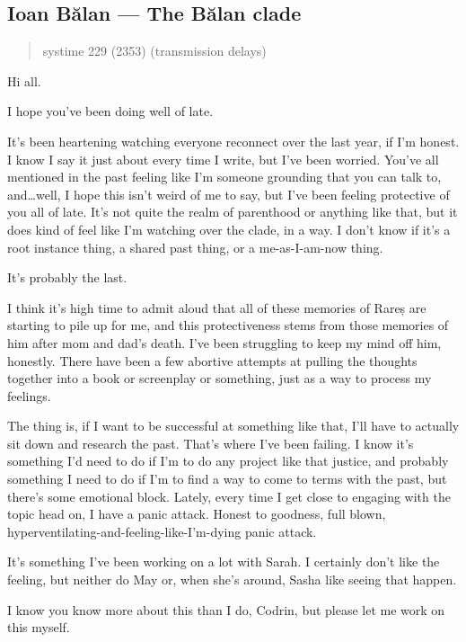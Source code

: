 \hypertarget{ioan-bux103lan-the-bux103lan-clade}{%
\subsection{Ioan Bălan — The Bălan clade}\label{ioan-bux103lan-the-bux103lan-clade}}

\begin{quote}
systime 229 (2353) (transmission delays)
\end{quote}

Hi all.

I hope you've been doing well of late.

It's been heartening watching everyone reconnect over the last year, if I'm honest. I know I say it just about every time I write, but I've been worried. You've all mentioned in the past feeling like I'm someone grounding that you can talk to, and\ldots well, I hope this isn't weird of me to say, but I've been feeling protective of you all of late. It's not quite the realm of parenthood or anything like that, but it does kind of feel like I'm watching over the clade, in a way. I don't know if it's a root instance thing, a shared past thing, or a me-as-I-am-now thing.

It's probably the last.

I think it's high time to admit aloud that all of these memories of Rareș are starting to pile up for me, and this protectiveness stems from those memories of him after mom and dad's death. I've been struggling to keep my mind off him, honestly. There have been a few abortive attempts at pulling the thoughts together into a book or screenplay or something, just as a way to process my feelings.

The thing is, if I want to be successful at something like that, I'll have to actually sit down and research the past. That's where I've been failing. I know it's something I'd need to do if I'm to do any project like that justice, and probably something I need to do if I'm to find a way to come to terms with the past, but there's some emotional block. Lately, every time I get close to engaging with the topic head on, I have a panic attack. Honest to goodness, full blown, hyperventilating-and-feeling-like-I'm-dying panic attack.

It's something I've been working on a lot with Sarah. I certainly don't like the feeling, but neither do May or, when she's around, Sasha like seeing that happen.

I know you know more about this than I do, Codrin, but please let me work on this myself.

